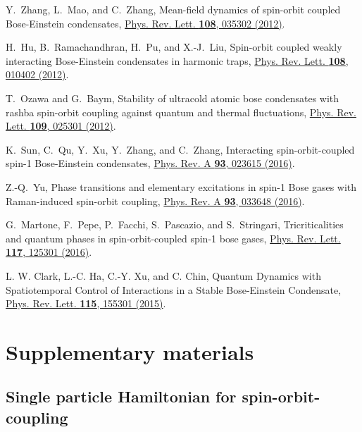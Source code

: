 \documentclass[twocolumn,prl,floatfix,citeautoscript,nofootinbib]{revtex4}
\begin{document}
\begin{thebibliography}{99}
 Y.~Zhang, L.~Mao, and C.~Zhang, \newblock Mean-field
dynamics of spin-orbit coupled Bose-Einstein condensates, \newblock \href{http://dx.doi.org/10.1103/PhysRevLett.108.035302}%
{Phys. Rev. Lett. \textbf{108}, 035302 (2012)}.

 H.~Hu, B.~Ramachandhran, H.~Pu, and X.-J.~Liu, %
\newblock Spin-orbit coupled weakly interacting Bose-Einstein condensates in
harmonic traps, \newblock \href{http://dx.doi.org/10.1103/PhysRevLett.108.010402}%
{Phys. Rev. Lett. \textbf{108}, 010402 (2012)}.

 T.~Ozawa and G.~Baym, \newblock Stability of
ultracold atomic bose condensates with rashba spin-orbit coupling against
quantum and thermal fluctuations, \newblock \href{http://dx.doi.org/10.1103/PhysRevLett.109.025301}%
{Phys. Rev. Lett. \textbf{109}, 025301 (2012)}.

 K.~Sun, C.~Qu, Y.~Xu, Y.~Zhang, and C.~Zhang, %
\newblock Interacting spin-orbit-coupled spin-1 Bose-Einstein condensates, %
\newblock \href{http://dx.doi.org/10.1103/PhysRevA.93.023615}{Phys. Rev. A
\textbf{93}, 023615 (2016)}.

 Z.-Q.~Yu, \newblock Phase transitions and elementary
excitations in spin-1 Bose gases with Raman-induced spin-orbit coupling, %
\newblock \href{http://dx.doi.org/10.1103/PhysRevA.93.033648}{Phys. Rev. A
\textbf{93}, 033648 (2016)}.

 G.~Martone, F.~Pepe, P.~Facchi,
S.~Pascazio, and S.~Stringari, \newblock Tricriticalities and quantum phases
in spin-orbit-coupled spin-1 bose gases, \newblock\href{http://dx.doi.org/10.1103/PhysRevLett.117.125301}%
{Phys. Rev. Lett. \textbf{117}, 125301 (2016)}.

 L. W. Clark, L.-C. Ha, C.-Y. Xu, and C. Chin, {Quantum
Dynamics with Spatiotemporal Control of Interactions in a Stable
Bose-Einstein Condensate}, \href{https://doi.org/10.1103/PhysRevLett.115.155301}%
{Phys. Rev. Lett. \textbf{115}, 155301 (2015)}.
\end{thebibliography}

\newpage \clearpage
\onecolumngrid
\appendix

\section{Supplementary materials}

\subsection{Single particle Hamiltonian for spin-orbit-coupling}
\end{document}
